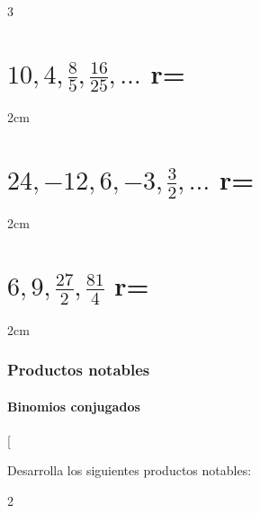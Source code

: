 \documentclass[12pt,addpoints,answers]{repaso}
\begin{document}
\begin{questions}
{\begin{multicols}{3}
\begin{parts}
                \part {\large $10,4,\frac{8}{5}, \frac{16}{25},\dots$ \quad r=\fillin[$\frac{2}{5}$][0cm]}

                \begin{solutionbox}{2cm}
                \end{solutionbox}

                \part {\large $24, -12, 6, -3, \frac{3}{2}, \dots$ \quad r=\fillin[$\frac{1}{2}$][0cm]}

                \begin{solutionbox}{2cm}
                \end{solutionbox}

                \part {\large $6, 9, \frac{27}{2}, \frac{81}{4}$ \quad r=\fillin[$\frac{3}{2}$][0cm]}

                \begin{solutionbox}{2cm}
                \end{solutionbox}
            \end{parts}
        \end{multicols}
    }

    \section{Productos notables}
    \subsection{Binomios conjugados}

    \ejemplosboxed[{Desarrolla los siguientes productos notables:
                \begin{multicols}{2}
\end{multicols}}
\end{questions}
\end{document}
